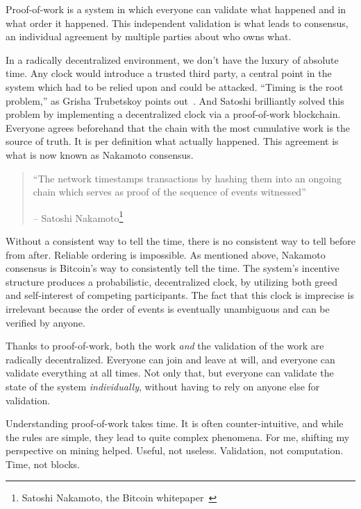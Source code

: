 Proof-of-work is a system in which everyone can validate what happened
and in what order it happened. This independent validation is what leads
to consensus, an individual agreement by multiple parties about who owns
what.

In a radically decentralized environment, we don't have the luxury of absolute
time. Any clock would introduce a trusted third party, a central point in the
system which had to be relied upon and could be attacked. \enquote{Timing is the root
problem,} as Grisha Trubetskoy points out~\cite{pow-clock}. And Satoshi
brilliantly solved this problem by implementing a decentralized clock via a
proof-of-work blockchain. Everyone agrees beforehand that the chain with the
most cumulative work is the source of truth. It is per definition what actually
happened. This agreement is what is now known as Nakamoto consensus.

\begin{quotation}\begin{samepage}
\enquote{The network timestamps transactions by hashing them into an ongoing
chain which serves as proof of the sequence of events witnessed}
\begin{flushright} -- Satoshi Nakamoto\footnote{Satoshi Nakamoto, the Bitcoin whitepaper~\cite{whitepaper}}
\end{flushright}\end{samepage}\end{quotation}

Without a consistent way to tell the time, there is no consistent way to
tell before from after. Reliable ordering is impossible. As mentioned
above, Nakamoto consensus is Bitcoin's way to consistently tell the
time. The system's incentive structure produces a probabilistic,
decentralized clock, by utilizing both greed and self-interest of
competing participants. The fact that this clock is imprecise is
irrelevant because the order of events is eventually unambiguous and can
be verified by anyone.

Thanks to proof-of-work, both the work \textit{and} the validation of the work
are radically decentralized. Everyone can join and leave at will, and
everyone can validate everything at all times. Not only that, but
everyone can validate the state of the system \textit{individually}, without
having to rely on anyone else for validation.

Understanding proof-of-work takes time. It is often counter-intuitive,
and while the rules are simple, they lead to quite complex phenomena.
For me, shifting my perspective on mining helped. Useful, not useless.
Validation, not computation. Time, not blocks.

